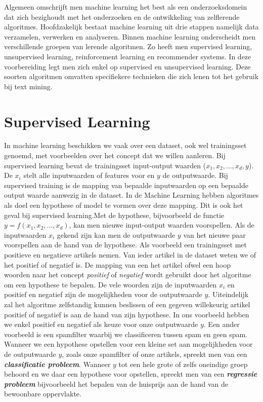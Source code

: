 Algemeen omschrijft men machine learning het best als een onderzoeksdomein dat zich bezighoudt met het onderzoeken en de ontwikkeling van zelflerende algoritmes. Hoofdzakelijk bestaat machine learning uit drie stappen namelijk data verzamelen, verwerken en analyseren.
\newline
Binnen machine learning onderscheidt men verschillende groepen van lerende algoritmen. Zo heeft men supervised learning, unsupervised learning, reinforcement learning en recommender systems. In deze voorbereiding legt men zich enkel op supervised en unsupervised learning. Deze soorten algoritmen omvatten specifiekere technieken die zich lenen tot het gebruik bij text mining.


\section{Supervised Learning}\label{Supervised Learning}

In machine learning beschikken we vaak over een dataset, ook wel trainingsset genoemd, met voorbeelden over het concept dat we willen aanleren. Bij supervised learning bevat de trainingsset input-output waarden ($x_{1},x_{2},...,x_{d},y$). De $x_{i}$ stelt alle inputwaarden of features voor en $y$ de outputwaarde. Bij supervised training is de mapping van bepaalde inputwaarden op een bepaalde output waarde aanwezig in de dataset. In de Machine Learning hebben algoritmes als doel een hypothese of model te vormen over deze mapping. Dit is ook het geval bij supervised learning.Met de hypothese, bijvoorbeeld de functie $y=f(x_{1},x_{2},...,x_{d})$, kan men nieuwe input-output waarden voorspellen. Als de inputwaarden $x_{i}$ gekend zijn kan men de outputwaarde $y$ van het nieuwe paar voorspellen aan de hand van de hypothese.  
\newline
Als voorbeeld een trainingsset met positieve en negatieve artikels nemen. Van ieder artikel in de dataset weten we of het positief of negatief is. De mapping van een het artikel ofwel een hoop woorden naar het concept \textit{positief} of \textit{negatief} wordt gebruikt door het algoritme om een hypothese te bepalen. De vele woorden zijn de inputwaarden $x_{i}$ en positief en negatief zijn de mogelijkheden voor de outputwaarde $y$. Uiteindelijk zal het algoritme zelfstandig kunnen beslissen of een gegeven willekeurig artikel positief of negatief is aan de hand van zijn hypothese.
\newline
In ons voorbeeld hebben we enkel positief en negatief als keuze voor onze outputwaarde $y$. Een ander voorbeeld is een spamfilter waarbij we classificeren tussen spam en geen spam. Wanneer we een hypothese opstellen voor een kleine set aan mogelijkheden voor de outputwaarde $y$, zoals onze spamfilter of onze artikels, spreekt men van een \textbf{\textit{classificatie probleem}}. Wanneer $y$ tot een hele grote of zelfs oneindige groep behoord en we daar een hypothese voor opstellen, spreekt men van een \textbf{\textit{regressie probleem}} bijvoorbeeld het bepalen van de huisprijs aan de hand van de bewoonbare oppervlakte.

